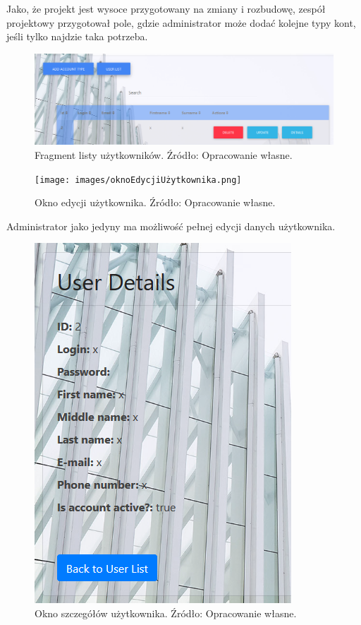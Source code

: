\documentclass[twoside]{projektInzynierskiMS}
\numberwithin{figure}{section}
\begin{document}
Jako, że projekt jest wysoce przygotowany na zmiany i rozbudowę, zespół projektowy przygotował pole, gdzie administrator może dodać kolejne typy kont, jeśli tylko najdzie taka potrzeba.

\begin{figure}[h!]
    \centering
    \includegraphics[width = \textwidth]{images/listaUżytkowników.png}
    \caption{Fragment listy użytkowników. Źródło: Opracowanie własne.}
    \label{fig:lista_użytkowników}
\end{figure}

\newpage

\begin{figure}[h!]
    \centering
    \texttt{[image: images/oknoEdycjiUżytkownika.png]}
    \caption{Okno edycji użytkownika. Źródło: Opracowanie własne.}
    \label{fig:edycja_użytkownika}
\end{figure}

Administrator jako jedyny ma możliwość pełnej edycji danych użytkownika.

\begin{figure}[h!]
    \centering
    \includegraphics[scale=0.6]{images/szczegółyUżytkownika.png}
    \caption{Okno szczegółów użytkownika. Źródło: Opracowanie własne.}
    \label{fig:szczegóły_użytkownika}
\end{figure}
\end{document}

